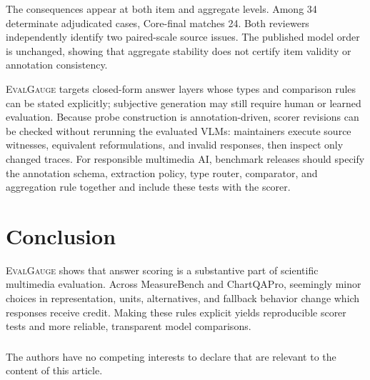 \documentclass[a4paper]{llncs}
\newcommand{\tool}{\textsc{EvalGauge}}
\begin{document}
The consequences appear at both item and aggregate levels. Among 34 determinate adjudicated cases, Core-final matches 24. Both reviewers independently identify two paired-scale source issues. The published model order is unchanged, showing that aggregate stability does not certify item validity or annotation consistency.

\tool{} targets closed-form answer layers whose types and comparison rules can be stated explicitly; subjective generation may still require human or learned evaluation. Because probe construction is annotation-driven, scorer revisions can be checked without rerunning the evaluated VLMs: maintainers execute source witnesses, equivalent reformulations, and invalid responses, then inspect only changed traces. For responsible multimedia AI, benchmark releases should specify the annotation schema, extraction policy, type router, comparator, and aggregation rule together and include these tests with the scorer.

\section{Conclusion}
\tool{} shows that answer scoring is a substantive part of scientific multimedia evaluation. Across MeasureBench and ChartQAPro, seemingly minor choices in representation, units, alternatives, and fallback behavior change which responses receive credit. Making these rules explicit yields reproducible scorer tests and more reliable, transparent model comparisons.

\begin{credits}
\subsubsection{\discintname}
The authors have no competing interests to declare that are relevant to the content of this article.
\end{credits}

\newpage


\end{document}
